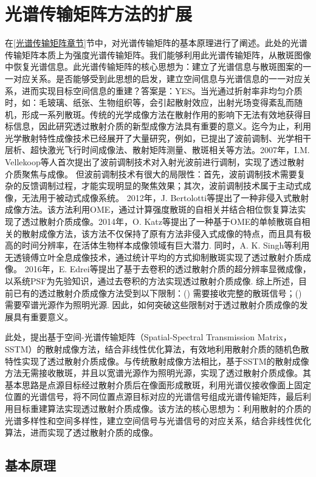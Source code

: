\section{光谱传输矩阵方法的扩展}
在\ref{光谱传输矩阵章节}节中，对光谱传输矩阵的基本原理进行了阐述。此处的光谱传输矩阵本质上为强度光谱传输矩阵。我们能够利用此光谱传输矩阵，从散斑图像中恢复光谱信息。此光谱传输矩阵的核心思想为：建立了光谱信息与散斑图案的一一对应关系。是否能够受到此思想的启发，建立空间信息与光谱信息的一一对应关系，进而实现目标空间信息的重建？答案是：YES。当光通过折射率非均匀介质时，如：毛玻璃、纸张、生物组织等，会引起散射效应，出射光场变得紊乱而随机，形成一系列散斑。传统的光学成像方法在散射作用的影响下无法有效地获得目标信息，因此研究透过散射介质的新型成像方法具有重要的意义。迄今为止，利用光学散射特性成像技术已经展开了大量研究，例如，已提出了波前调制、光学相干层析、超快激光飞行时间成像法、散射矩阵测量、散斑相关等方法。2007年，I.M. Vellekoop等人首次提出了波前调制技术对入射光波前进行调制，实现了透过散射介质聚焦与成像。 但波前调制技术有很大的局限性：首先，波前调制技术需要复杂的反馈调制过程，才能实现明显的聚焦效果；其次，波前调制技术属于主动式成像，无法用于被动式成像系统。 2012年，J. Bertolotti等提出了一种非侵入式散射成像方法。该方法利用OME，通过计算强度散斑的自相关并结合相位恢复算法实现了透过散射介质成像。2014年，O. Katz等提出了一种基于OME的单帧散斑自相关的散射成像方法，该方法不仅保持了原有方法非侵入式成像的特点，而且具有极高的时间分辨率，在活体生物样本成像领域有巨大潜力. 同时，A. K. Singh等利用无透镜傅立叶全息成像技术，通过统计平均的方式抑制散斑实现了透过散射介质成像。 2016年，E. Edrei等提出了基于去卷积的透过散射介质的超分辨率显微成像，以系统PSF为先验知识，通过去卷积的方法实现透过散射介质成像. 综上所述，目前已有的透过散射介质成像方法受到以下限制：() 需要接收完整的散斑信号；() 需要窄谱光源作为照明光源. 因此，如何突破这些限制对于透过散射介质成像的发展具有重要意义。

此处，提出基于空间-光谱传输矩阵（Spatial-Spectral Transmission Matrix，SSTM）的散射成像方法，结合非线性优化算法，有效地利用散射介质的随机色散特性实现了透过散射介质成像。与传统散射成像方法相比，基于SSTM的散射成像方法无需接收散斑，并且以宽谱光源作为照明光源，实现了透过散射介质成像。其基本思路是点源目标经过散射介质后在像面形成散斑，利用光谱仪接收像面上固定位置的光谱信号，将不同位置点源目标对应的光谱信号组成光谱传输矩阵，最后利用目标重建算法实现透过散射介质成像。该方法的核心思想为：利用散射的介质的光谱多样性和空间多样性，建立空间信号与光谱信号的对应关系，结合非线性优化算法，进而实现了透过散射介质的成像。
\subsection{基本原理}

